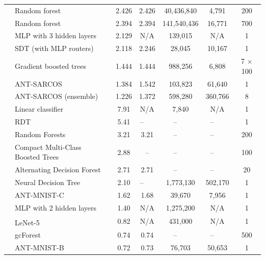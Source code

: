 \begin{table}[ht!]
\begin{tabular}{|c|l|cc|cc|c|}
		& Random forest & 2.426 & 2.426 & 40,436,840 & 4,791 & 200 \\
		& Random forest & 2.394 & 2.394 & 141,540,436 & 16,771 & 700 \\
		& MLP with 3 hidden layers & 2.129 & N/A & 139,015 & N/A & 1 \\
		&\cellcolor{gray!10}SDT (with MLP routers) &\cellcolor{gray!10} 2.118 &\cellcolor{gray!10} 2.246 &\cellcolor{gray!10} 28,045  &\cellcolor{gray!10} 10,167 &\cellcolor{gray!10} 1\\
		& Gradient boosted trees & 1.444 & 1.444 & 988,256 & 6,808 & 7 $\times$ 100 \\
		&\cellcolor{gray!10}ANT-SARCOS &\cellcolor{gray!10} 1.384 &\cellcolor{gray!10}  1.542 &\cellcolor{gray!10} 103,823  
		&\cellcolor{gray!10} 61,640 &\cellcolor{gray!10} 1\\
		&\cellcolor{gray!10}ANT-SARCOS (ensemble) &\cellcolor{gray!10} 1.226 &\cellcolor{gray!10}  1.372 &\cellcolor{gray!10} 598,280  
		&\cellcolor{gray!10} 360,766 &\cellcolor{gray!10} 8\\
		\hline
		\parbox[t]{2mm}{\multirow{14}{*}{\rotatebox[origin=c]{90}{MNIST}}}
		& Linear classifier & 7.91& N/A & 7,840 & N/A&1\\
		& RDT \cite{leon2015policy} & 5.41 & --~~~ & --~~~ & --~~~ & 1\\
		& Random Forests \cite{breiman2001random}& 3.21 & 3.21 & --~~~ & --~~~ &200\\
		& Compact Multi-Class Boosted Trees \cite{ponomareva2017compact} & 2.88 & -- & --~~~  & --~~~ &100 \\
		& Alternating Decision Forest  \cite{schulter2013alternating} & 2.71 & 2.71 & --~~~  & --~~~ &20 \\
		& Neural Decision Tree \cite{xiao2017ndt}& 2.10 & --~~~ &1,773,130 & 502,170&1\\
		&ANT-MNIST-C & 1.62 & 1.68 & 39,670 & 7,956 & 1\\
		& MLP with 2 hidden layers \cite{simard2003best}& 1.40 & N/A & 1,275,200& N/A&1 \\
		& LeNet-5\textsuperscript{\textdagger} \cite{lecun1998gradient} & 0.82 & N/A& 431,000 & N/A & 1\\
		& gcForest \cite{zhou2017deepft} & 0.74 &  0.74 & --~~~  & --~~~  & 500\\
		&ANT-MNIST-B & 0.72 & 0.73 & 76,703 & 50,653 & 1\\

\end{tabular}
\end{table}
